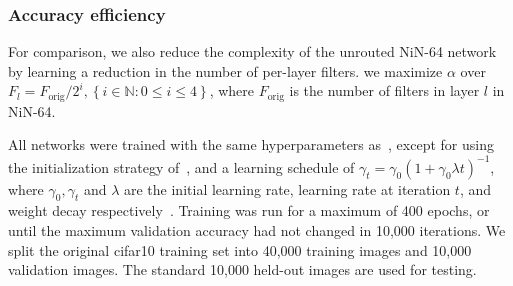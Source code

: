 \documentclass[thesis]{subfiles}
\begin{document}
	\subsubsection{Accuracy \vs{}efficiency}
	For comparison, we also reduce the complexity of the unrouted NiN-64 network by learning a reduction in the number of per-layer filters. 
	\ie we maximize $\alpha$ over $F_l = F_\textrm{orig}/2^i, \left\{i\in \mathbb{N} : 0 \le i \le 4\right\}$, where $F_\textrm{orig}$ is the number of filters in layer $l$ in NiN-64. 
	
	All networks were trained with the same hyperparameters as~\citep{Lin2013NiN}, 
	except for using the initialization strategy of~\citep{He2015b}, 
	and a learning schedule of $\gamma_t = \gamma_0(1+\gamma_0\lambda t)^{-1}$, where $\gamma_0,\gamma_t$ and $\lambda$ are the initial learning rate, learning rate at iteration $t$, and weight decay respectively~\citep{Bottou2012sgdtricks}. Training was run for a maximum of 400 epochs, or until the maximum validation accuracy had not changed in 10,000 iterations. 
	We split the original \gls{cifar10} training set into 40,000 training images and 
	10,000 validation images. 
	The standard 10,000 held-out images are used for testing.
	
\end{document}
